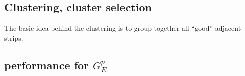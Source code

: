 \subsection{Clustering, cluster selection}
\label{cluster_algo}

The basic idea behind the clustering is to group together all ``good'' adjacent strips.

\subsection{performance for $G_E^p$}

%
%
%
%

%
%
%
